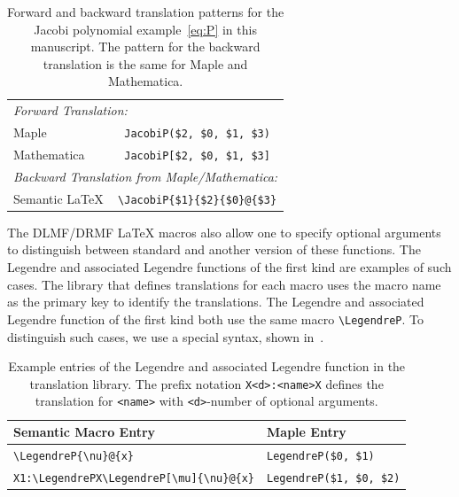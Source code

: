 \documentclass[a4paper,11pt]{article}
\newcommand{\DLMF}{DLMF}
\newcommand{\DRMF}{DRMF}
\newcommand{\Maple}{Maple}
\newcommand{\Mathematica}{Mathematica}
\newcommand{\Macro}{\DLMF/\DRMF{} \LaTeX{} macro}
\theoremstyle{defTheoStyle}
\theoremstyle{defExampStyle}
\begin{document}
	\begin{table}[ht]
		\centering
		\begin{tabular}{lc}
			\hline
			\multicolumn{2}{l}{\textit{Forward Translation:}} \\
			\Maple & \verb|JacobiP($2, $0, $1, $3)| \\
			\Mathematica & \verb|JacobiP[$2, $0, $1, $3]|\\
			\hline
			\multicolumn{2}{l}{\textit{Backward Translation from \Maple/\Mathematica:}} \\
			Semantic \LaTeX & \verb|\JacobiP{$1}{$2}{$0}@{$3}|\\
			\hline
		\end{tabular}
		\caption{Forward and backward translation patterns for the Jacobi polynomial example~\eqref{eq:P} in this manuscript. The pattern for the backward translation is the same for \Maple{} and \Mathematica.}
		\label{tab:placeholder_ex2}
	\end{table}
	
	The \Macro s also allow one to specify optional arguments to distinguish between standard and another version of these functions. The Legendre and associated Legendre functions of the first kind are examples of such cases. The library that defines translations for each macro uses the macro name as the primary key to identify the translations. The Legendre and associated Legendre function of the first kind both use the same macro \verb|\LegendreP|. To distinguish such cases, we use a special syntax, shown in~.
	
	\begin{table}[ht!]
		\centering
		\begin{tabular}{ll}
			\hline
			Semantic Macro Entry & \Maple{} Entry \\
			\hline
			\verb|\LegendreP{\nu}@{x}| & \verb|LegendreP($0, $1)| \\
			\verb|X1:\LegendrePX\LegendreP[\mu]{\nu}@{x}| & \verb|LegendreP($1, $0, $2)|\\
			\hline
		\end{tabular}
		\caption{Example entries of the Legendre and associated Legendre function in the translation library. The prefix notation \texttt{X<d>:<name>X} defines the translation for \texttt{<name>} with \texttt{<d>}-number of optional arguments.}
		\label{tab:legendreP-lex}
	\end{table}
	
\end{document}
